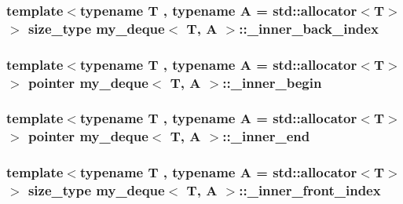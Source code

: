 \hypertarget{classmy__deque_a56da119beedfbdf3f6621b539adca62b}{
\subsubsection[{\-\_\-inner\-\_\-back\-\_\-index}]{\setlength{\rightskip}{0pt plus 5cm}template$<$typename T , typename A  = std\-::allocator$<$\-T$>$$>$ {\bf size\-\_\-type} {\bf my\-\_\-deque}$<$ T, A $>$\-::\-\_\-inner\-\_\-back\-\_\-index\hspace{0.3cm}{\ttfamily [private]}}}\label{classmy__deque_a56da119beedfbdf3f6621b539adca62b}
\hypertarget{classmy__deque_a2aeaf57f8cd8cba7010dd50493146921}{
\subsubsection[{\-\_\-inner\-\_\-begin}]{\setlength{\rightskip}{0pt plus 5cm}template$<$typename T , typename A  = std\-::allocator$<$\-T$>$$>$ {\bf pointer} {\bf my\-\_\-deque}$<$ T, A $>$\-::\-\_\-inner\-\_\-begin\hspace{0.3cm}{\ttfamily [private]}}}\label{classmy__deque_a2aeaf57f8cd8cba7010dd50493146921}
\hypertarget{classmy__deque_a2d72c547c3fdcba3db1517a6a93f1824}{
\subsubsection[{\-\_\-inner\-\_\-end}]{\setlength{\rightskip}{0pt plus 5cm}template$<$typename T , typename A  = std\-::allocator$<$\-T$>$$>$ {\bf pointer} {\bf my\-\_\-deque}$<$ T, A $>$\-::\-\_\-inner\-\_\-end\hspace{0.3cm}{\ttfamily [private]}}}\label{classmy__deque_a2d72c547c3fdcba3db1517a6a93f1824}
\hypertarget{classmy__deque_a866a4e483dcb9ea552ba867cfbf22e0c}{
\subsubsection[{\-\_\-inner\-\_\-front\-\_\-index}]{\setlength{\rightskip}{0pt plus 5cm}template$<$typename T , typename A  = std\-::allocator$<$\-T$>$$>$ {\bf size\-\_\-type} {\bf my\-\_\-deque}$<$ T, A $>$\-::\-\_\-inner\-\_\-front\-\_\-index\hspace{0.3cm}{\ttfamily [private]}}}\label{classmy__deque_a866a4e483dcb9ea552ba867cfbf22e0c}

